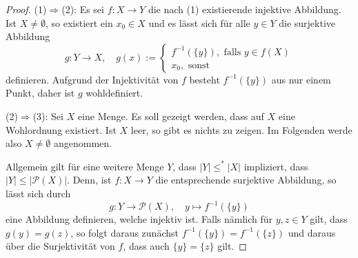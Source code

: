\begin{proof}
  (1)$\Rightarrow$(2):
  Es sei $f \colon X \to Y$ die nach (1) existierende injektive Abbildung.
  Ist $X \neq \emptyset$, so existiert ein $x_0 \in X$ und es lässt sich für alle $y \in Y$ die surjektive Abbildung
  \begin{displaymath}
    g \colon Y \to X, \quad g(x) := 
    \begin{cases}
      f^{-1}(\{y\}), \text{ falls } y \in f(X)\\
      x_0, \text{ sonst}
    \end{cases}
  \end{displaymath}
  definieren. Aufgrund der Injektivität von $f$ besteht $f^{-1}(\{y\})$ aus nur einem Punkt, daher ist $g$ wohldefiniert.

  (2)$\Rightarrow$(3):
  Sei $X$ eine Menge.
  Es soll gezeigt werden, dass auf $X$ eine Wohlordnung existiert. 
  Ist $X$ leer, so gibt es nichts zu zeigen. Im Folgenden werde also $X \neq \emptyset$ angenommen.

  Allgemein gilt für eine weitere Menge $Y$, dass $|Y| \leq^* |X|$ impliziert, dass $|Y| \leq |\mathcal{P}(X)|$.
  Denn, ist $f \colon X \to Y$ die entsprechende surjektive Abbildung, so lässt sich durch
  \begin{displaymath}
    g \colon Y \to \mathcal{P}(X), \quad y \mapsto f^{-1}(\{y\})
  \end{displaymath}
  eine Abbildung definieren, welche injektiv ist.
  Falls nämlich für $y,z \in Y$ gilt, dass $g(y) = g(z)$, so folgt daraus zunächst $f^{-1}(\{y\}) = f^{-1}(\{z\})$ und daraus über die Surjektivität von $f$, dass auch $\{y\} = \{z\}$ gilt.



\end{proof}
